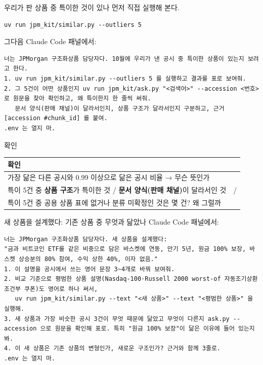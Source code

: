 \begin{frame}[fragile]{ 우리가 판 상품 중 특이한 것이 있나 }
먼저 직접 실행해 본다.
\begin{Verbatim}
uv run jpm_kit/similar.py --outliers 5
\end{Verbatim}
그다음 Claude Code 패널에서:
\begin{Verbatim}[fontsize=\footnotesize]
너는 JPMorgan 구조화상품 담당자다. 10월에 우리가 낸 공시 중 특이한 상품이 있는지 보려고 한다.
1. uv run jpm_kit/similar.py --outliers 5 를 실행하고 결과를 표로 보여줘.
2. 그 5건이 어떤 상품인지 uv run jpm_kit/ask.py "<검색어>" --accession <번호> 로 원문을 찾아 확인하고, 왜 특이한지 한 줄씩 써줘.
   문서 양식(판매 채널)이 달라서인지, 상품 구조가 달라서인지 구분하고, 근거 [accession #chunk_id] 를 붙여.
.env 는 열지 마.
\end{Verbatim}
\end{frame}

\begin{frame}{ 확인}
\begin{tabularx}{\textwidth}{@{}X p{5.6cm}@{}}
\toprule
\textbf{확인} & \\
\midrule
가장 닮은 다른 공시와 0.99 이상으로 닮은 공시 비율 → 무슨 뜻인가 & \\[8pt]
특이 5건 중 \textbf{상품 구조}가 특이한 것 / \textbf{문서 양식(판매 채널)}이 달라서인 것 & \hfill / \hfill\null \\[8pt]
특이 5건 중 공용 상품 표에 없거나 분류 미확정인 것은 몇 건? 왜 그럴까 & \\[8pt]
\bottomrule
\end{tabularx}
\end{frame}

\begin{frame}[fragile]{ 새 상품을 설계했다: 기존 상품 중 무엇과 닮았나 }
\small Claude Code 패널에서:
\begin{Verbatim}[fontsize=\footnotesize]
너는 JPMorgan 구조화상품 담당자다. 새 상품을 설계했다:
"금과 비트코인 ETF를 같은 비중으로 담은 바스켓에 연동, 만기 5년, 원금 100% 보장, 바스켓 상승분의 80% 참여, 수익 상한 40%, 이자 없음."
1. 이 설명을 공시에서 쓰는 영어 문장 3~4개로 바꿔 보여줘.
2. 비교 기준으로 평범한 상품 설명(Nasdaq-100·Russell 2000 worst-of 자동조기상환 조건부 쿠폰)도 영어로 하나 써서,
   uv run jpm_kit/similar.py --text "<새 상품>" --text "<평범한 상품>" 을 실행해.
3. 새 상품과 가장 비슷한 공시 3건이 무엇 때문에 닮았고 무엇이 다른지 ask.py --accession 으로 원문을 확인해 표로. 특히 "원금 100% 보장"이 닮은 이유에 들어 있는지 봐.
4. 이 새 상품은 기존 상품의 변형인가, 새로운 구조인가? 근거와 함께 3줄로.
.env 는 열지 마.
\end{Verbatim}
\end{frame}

